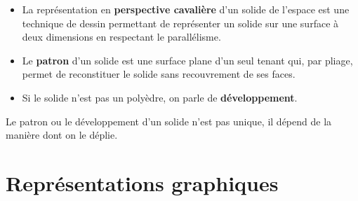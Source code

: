 \begin{definition}
   \begin{itemize}
      \item La représentation en \textbf{perspective cavalière} d'un solide de l'espace est une technique de dessin permettant de représenter un solide sur une surface à deux dimensions en respectant le parallélisme.
      \item Le \textbf{patron} d'un solide est une surface plane d'un seul tenant qui, par pliage, permet de reconstituer le solide sans recouvrement de ses faces.
      \item Si le solide n'est pas un polyèdre, on parle de {\bf développement}. \\ [-8mm]
   \end{itemize}
\end{definition}

\bigskip
Le patron ou le développement d'un solide n'est pas unique, il dépend de la manière dont on le déplie.


\section{Représentations graphiques}

